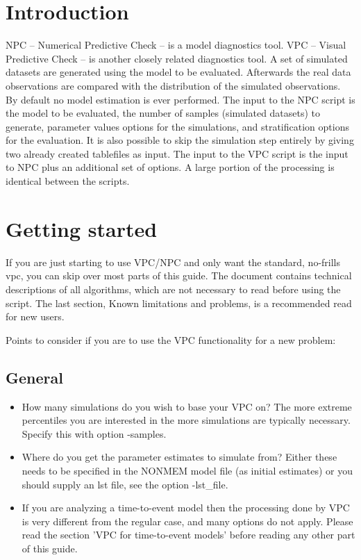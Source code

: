 



\maketitle

\section{Introduction}
NPC – Numerical Predictive Check – is a model diagnostics tool. VPC – Visual Predictive Check – is another closely related diagnostics tool. A set of simulated datasets are generated using the model to be evaluated. Afterwards the real data observations are compared with the distribution of the simulated observations. By default no model estimation is ever performed. The input to the NPC script is the model to be evaluated, the number of samples (simulated datasets) to generate, parameter values options for the simulations, and stratification options for the evaluation. It is also possible to skip the simulation step entirely by giving two already created tablefiles as input. The input to the VPC script is the input to NPC plus an additional set of options. A large portion of the processing is identical between the scripts.

\section{Getting started}
If you are just starting to use VPC/NPC and only want the standard, no-frills vpc, you can skip over most parts of this guide. The document contains technical descriptions of all algorithms, which are not necessary to read before using the script. The last section, Known limitations and problems, is a recommended read for new users.

Points to consider if you are to use the VPC functionality for a new problem:

\subsection{General}

\begin{itemize}
	\item How many simulations do you wish to base your VPC on? The more extreme percentiles you are interested in the more simulations are typically necessary. Specify this with option -samples.
	\item Where do you get the parameter estimates to simulate from? Either these needs to be specified in the NONMEM model file (as initial estimates) or you should supply an lst file, see the option -lst\_file.
	\item If you are analyzing a time-to-event model then the processing done by VPC is very different from the regular case, and many options do not apply. Please read the section 'VPC for time-to-event models' before reading any other part of this guide.
\end{itemize}

